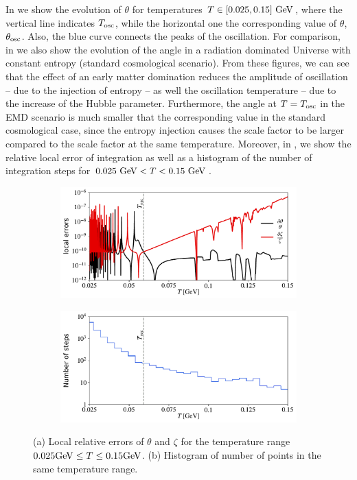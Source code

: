 \documentclass[11pt,a4paper]{article}
\begin{document}
%
In  we show the evolution  of $\theta$ for temperatures $T \in [0.025,0.15]~{\rm GeV}$, where the vertical line indicates $T_{\rm osc}{}$, while the horizontal one the corresponding value of $\theta$, $\theta_{\rm osc}{}$. Also, the blue curve connects the peaks of the oscillation. For comparison, in  we also show the evolution of the angle in a radiation dominated Universe with constant entropy (\ie standard cosmological scenario). From these figures, we can see that the effect of an early matter domination reduces the amplitude of oscillation -- due to the injection of entropy -- as well the oscillation temperature -- due to the increase of the Hubble parameter. Furthermore,  the angle at $T=T_{\rm osc}{}$ in the EMD scenario is much smaller that the corresponding value in the standard cosmological case, since the entropy injection causes the scale factor to be larger compared to the scale factor at the same temperature.
%
Moreover, in , we show the relative local error of integration as well as a histogram of the number of integration steps for $0.025~{\rm GeV} < T < 0.15 ~{\rm GeV}$.
%
\begin{figure}[h]
	\begin{subfigure}[]{0.5\textwidth}
		\includegraphics[width=1\textwidth]{figs/local_errors-EMD.pdf}
		\caption{}
		\label{fig:local_errors-EMD}
	\end{subfigure}
	\begin{subfigure}[]{0.5\textwidth}
		\includegraphics[width=1\textwidth]{figs/histogram-EMD.pdf}
		\caption{}
		\label{fig:histogram-EMD}
	\end{subfigure}
	\caption{(a) Local relative errors of $\theta$ and $\zeta$ for the temperature range $0.025{\rm GeV} \leq T \leq 0.15{\rm GeV}$. 
			 (b) Histogram of number of points in the same temperature range.}
	\label{fig:RK_response}
\end{figure}
\end{document}

